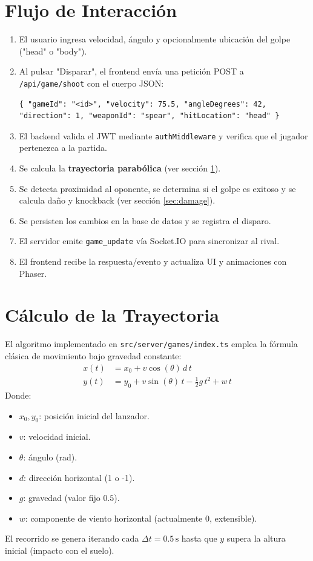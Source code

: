 \documentclass[12pt]{article}
\begin{document}
\section*{Flujo de Interacción}
\begin{enumerate}
  \item El usuario ingresa velocidad, ángulo y opcionalmente ubicación del golpe ("head" o "body").
  \item Al pulsar "Disparar", el frontend envía una petición POST a \texttt{/api/game/shoot} con el cuerpo JSON:
\begin{verbatim}
{ "gameId": "<id>", "velocity": 75.5, "angleDegrees": 42, "direction": 1, "weaponId": "spear", "hitLocation": "head" }
\end{verbatim}
  \item El backend valida el JWT mediante \texttt{authMiddleware} y verifica que el jugador pertenezca a la partida.
  \item Se calcula la \textbf{trayectoria parabólica} (ver sección \ref{sec:trajectory}).
  \item Se detecta proximidad al oponente, se determina si el golpe es exitoso y se calcula daño y knockback (ver sección \ref{sec:damage}).
  \item Se persisten los cambios en la base de datos y se registra el disparo.
  \item El servidor emite \texttt{game\_update} vía Socket.IO para sincronizar al rival.
  \item El frontend recibe la respuesta/evento y actualiza UI y animaciones con Phaser.
\end{enumerate}

\section{Cálculo de la Trayectoria}\label{sec:trajectory}
El algoritmo implementado en \texttt{src/server/games/index.ts} emplea la fórmula clásica de movimiento bajo gravedad constante:
\begin{align}
  x(t) &= x_{0} + v\cos(\theta)\,d\,t \\
  y(t) &= y_{0} + v\sin(\theta)\,t - \frac{1}{2}g\,t^{2} + w\,t
\end{align}
Donde:
\begin{itemize}
  \item $x_{0},y_{0}$: posición inicial del lanzador.
  \item $v$: velocidad inicial.
  \item $\theta$: ángulo (rad).
  \item $d$: dirección horizontal (1 o -1).
  \item $g$: gravedad (valor fijo $0.5$).
  \item $w$: componente de viento horizontal (actualmente $0$, extensible).
\end{itemize}
El recorrido se genera iterando cada $\Delta t = 0.5\,\text{s}$ hasta que $y$ supera la altura inicial (impacto con el suelo).
\end{document}
